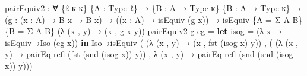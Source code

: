 \documentclass[
  11pt,
  oneside,
  article]{memoir}
\newenvironment{Shaded}{}{}
\newcommand{\KeywordTok}[1]{\textcolor[rgb]{0.00,0.44,0.13}{\textbf{#1}}}
\newcommand{\NormalTok}[1]{#1}
\newcommand{\OtherTok}[1]{\textcolor[rgb]{0.00,0.44,0.13}{#1}}
\theoremstyle{definition}
\theoremstyle{plain}
\newcommand{\0}{\textsf{0}}
\newcommand{\1}{\tn{\textsf{1}}}
\begin{document}
\begin{Shaded}
\begin{Highlighting}[]
\NormalTok{pairEquiv2 }\OtherTok{:} \OtherTok{∀} \OtherTok{\{}\NormalTok{ℓ κ κ\textquotesingle{}}\OtherTok{\}} \OtherTok{\{}\NormalTok{A }\OtherTok{:}\NormalTok{ Type ℓ}\OtherTok{\}} 
             \OtherTok{→} \OtherTok{\{}\NormalTok{B }\OtherTok{:}\NormalTok{ A }\OtherTok{→}\NormalTok{ Type κ}\OtherTok{\}} \OtherTok{\{}\NormalTok{B\textquotesingle{} }\OtherTok{:}\NormalTok{ A }\OtherTok{→}\NormalTok{ Type κ\textquotesingle{}}\OtherTok{\}}
             \OtherTok{→} \OtherTok{(}\NormalTok{g }\OtherTok{:} \OtherTok{(}\NormalTok{x }\OtherTok{:}\NormalTok{ A}\OtherTok{)} \OtherTok{→}\NormalTok{ B x }\OtherTok{→}\NormalTok{ B\textquotesingle{} x}\OtherTok{)} \OtherTok{→} \OtherTok{((}\NormalTok{x }\OtherTok{:}\NormalTok{ A}\OtherTok{)} \OtherTok{→}\NormalTok{ isEquiv }\OtherTok{(}\NormalTok{g x}\OtherTok{))}
             \OtherTok{→}\NormalTok{ isEquiv }\OtherTok{\{}\NormalTok{A }\OtherTok{=}\NormalTok{ Σ A B}\OtherTok{\}} \OtherTok{\{}\NormalTok{B }\OtherTok{=}\NormalTok{ Σ A B\textquotesingle{}}\OtherTok{\}}
                       \OtherTok{(λ} \OtherTok{(}\NormalTok{x , y}\OtherTok{)} \OtherTok{→} \OtherTok{(}\NormalTok{x , g x y}\OtherTok{))}
\NormalTok{pairEquiv2 g eg }\OtherTok{=}
    \KeywordTok{let}\NormalTok{ isog }\OtherTok{=} \OtherTok{(λ}\NormalTok{ x }\OtherTok{→}\NormalTok{ isEquiv→Iso }\OtherTok{(}\NormalTok{eg x}\OtherTok{))} 
    \KeywordTok{in}\NormalTok{ Iso→isEquiv }\OtherTok{(} \OtherTok{(λ} \OtherTok{(}\NormalTok{x , y}\OtherTok{)} \OtherTok{→} \OtherTok{(}\NormalTok{x , fst }\OtherTok{(}\NormalTok{isog x}\OtherTok{)}\NormalTok{ y}\OtherTok{))} 
\NormalTok{                   , }\OtherTok{(} \OtherTok{(λ} \OtherTok{(}\NormalTok{x , y}\OtherTok{)} \OtherTok{→} 
\NormalTok{                          pairEq refl }\OtherTok{(}\NormalTok{fst }\OtherTok{(}\NormalTok{snd }\OtherTok{(}\NormalTok{isog x}\OtherTok{))}\NormalTok{ y}\OtherTok{))} 
\NormalTok{                     , }\OtherTok{λ} \OtherTok{(}\NormalTok{x , y}\OtherTok{)} \OtherTok{→} 
\NormalTok{                         pairEq refl }\OtherTok{(}\NormalTok{snd }\OtherTok{(}\NormalTok{snd }\OtherTok{(}\NormalTok{isog x}\OtherTok{))}\NormalTok{ y}\OtherTok{)))}


\end{Highlighting}
\end{Shaded}
\end{document}
